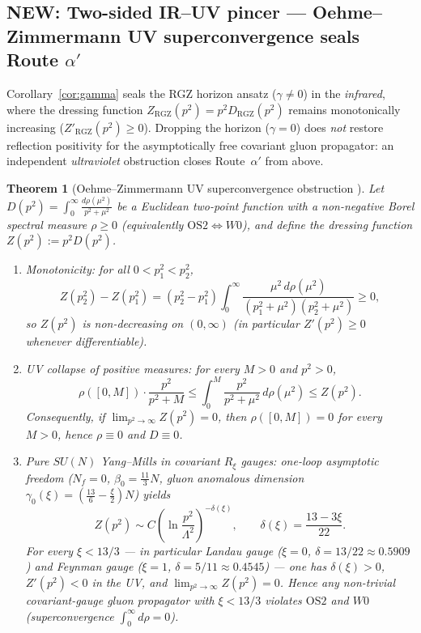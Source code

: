 \documentclass[11pt,a4paper]{article}
\theoremstyle{plain}
\newtheorem{theorem}{Theorem}[section]
\theoremstyle{definition}
\theoremstyle{remark}
\newcommand{\OS}{\mathrm{OS}}\newcommand{\Gap}{\mathrm{Gap}}
\renewcommand{\_}{\oldunderscore\allowbreak}
\begin{document}
\subsection{NEW: Two-sided IR--UV pincer --- Oehme--Zimmermann UV superconvergence seals Route \texorpdfstring{$\alpha'$}{alpha'}}\label{sub:oz}
Corollary~\ref{cor:gamma} seals the RGZ horizon ansatz ($\gamma\neq0$) in the \emph{infrared}, where the dressing function $Z_{\mathrm{RGZ}}(p^2)=p^2D_{\mathrm{RGZ}}(p^2)$ remains monotonically increasing ($Z'_{\mathrm{RGZ}}(p^2)\ge0$). Dropping the horizon ($\gamma=0$) does \emph{not} restore reflection positivity for the asymptotically free covariant gluon propagator: an independent \emph{ultraviolet} obstruction closes Route~$\alpha'$ from above.
\begin{theorem}[Oehme--Zimmermann UV superconvergence obstruction \cite{OehmeZimmermann1980}]\label{thm:oz}
Let $D(p^2)=\int_0^\infty \frac{d\rho(\mu^2)}{p^2+\mu^2}$ be a Euclidean two-point function with a non-negative Borel spectral measure $\rho\ge0$ (equivalently $\OS2\iff W0$), and define the dressing function $Z(p^2):=p^2D(p^2)$.
\begin{enumerate}[label=(\roman*),leftmargin=22pt,itemsep=1pt]
\item \emph{Monotonicity:} for all $0<p_1^2<p_2^2$,
\[Z(p_2^2)-Z(p_1^2)=(p_2^2-p_1^2)\int_0^\infty\frac{\mu^2\,d\rho(\mu^2)}{(p_1^2+\mu^2)(p_2^2+\mu^2)}\ge 0,\]
so $Z(p^2)$ is non-decreasing on $(0,\infty)$ (in particular $Z'(p^2)\ge0$ whenever differentiable).
\item \emph{UV collapse of positive measures:} for every $M>0$ and $p^2>0$,
\[\rho([0,M])\cdot\frac{p^2}{p^2+M}\le\int_0^M\frac{p^2}{p^2+\mu^2}\,d\rho(\mu^2)\le Z(p^2).\]
Consequently, if $\lim_{p^2\to\infty} Z(p^2)=0$, then $\rho([0,M])=0$ for every $M>0$, hence $\rho\equiv0$ and $D\equiv0$.
\item \emph{Pure $SU(N)$ Yang--Mills in covariant $R_\xi$ gauges:} one-loop asymptotic freedom ($N_f=0$, $\beta_0=\tfrac{11}{3}N$, gluon anomalous dimension $\gamma_0(\xi)=(\tfrac{13}{6}-\tfrac{\xi}{2})N$) yields
\[Z(p^2)\sim C\left(\ln\frac{p^2}{\Lambda^2}\right)^{-\delta(\xi)},\qquad \delta(\xi)=\frac{13-3\xi}{22}.\]
For every $\xi<13/3$ --- in particular Landau gauge ($\xi=0$, $\delta=13/22\approx 0.5909$) and Feynman gauge ($\xi=1$, $\delta=5/11\approx 0.4545$) --- one has $\delta(\xi)>0$, $Z'(p^2)<0$ in the UV, and $\lim_{p^2\to\infty}Z(p^2)=0$. Hence any non-trivial covariant-gauge gluon propagator with $\xi<13/3$ violates $\OS2$ and $W0$ (superconvergence $\int_0^\infty d\rho=0$).
\end{enumerate}
\end{theorem}
\end{document}
